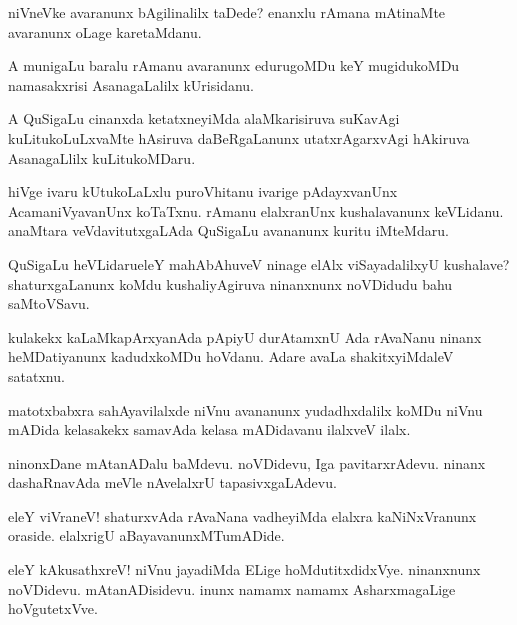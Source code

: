 \begin{mng}
niVneVke avaranunx bAgilinalilx taDede? enanxlu rAmana mAtinaMte avaranunx oLage karetaMdanu.
\end{mng}

\begin{mng}
A munigaLu baralu rAmanu avaranunx edurugoMDu keY mugidukoMDu namasakxrisi AsanagaLalilx kUrisidanu.
\end{mng}

\begin{mng}
A QuSigaLu cinanxda ketatxneyiMda alaMkarisiruva suKavAgi kuLitukoLuLxvaMte hAsiruva daBeRgaLanunx utatxrAgarxvAgi hAkiruva AsanagaLlilx kuLitukoMDaru.
\end{mng}

\begin{mng}
hiVge ivaru kUtukoLaLxlu puroVhitanu ivarige pAdayxvanUnx AcamaniVyavanUnx koTaTxnu. rAmanu elalxranUnx kushalavanunx keVLidanu. anaMtara veVdavitutxgaLAda QuSigaLu avananunx kuritu iMteMdaru.
\end{mng}

\begin{mng}
QuSigaLu heVLidaru\mdash eleY mahAbAhuveV ninage elAlx viSayadalilxyU kushalave? shaturxgaLanunx koMdu kushaliyAgiruva ninanxnunx noVDidudu bahu saMtoVSavu.
\end{mng}

\begin{mng}
kulakekx kaLaMkapArxyanAda pApiyU durAtamxnU Ada rAvaNanu ninanx heMDatiyanunx kadudxkoMDu hoVdanu. Adare avaLa shakitxyiMdaleV satatxnu.
\end{mng}

\begin{mng}
matotxbabxra sahAyavilalxde niVnu avananunx yudadhxdalilx koMDu niVnu mADida kelasakekx samavAda kelasa mADidavanu ilalxveV ilalx.
\end{mng}

\begin{mng}
ninonxDane mAtanADalu baMdevu. noVDidevu, Iga pavitarxrAdevu. ninanx dashaRnavAda meVle nAvelalxrU tapasivxgaLAdevu.
\end{mng}

\begin{mng}
eleY viVraneV! shaturxvAda rAvaNana vadheyiMda elalxra kaNiNxVranunx oraside. elalxrigU aBayavanunxMTumADide.
\end{mng}

\begin{mng}
eleY kAkusathxreV! niVnu jayadiMda ELige hoMdutitxdidxVye. ninanxnunx noVDidevu. mAtanADisidevu. inunx namamx namamx AsharxmagaLige hoVgutetxVve.
\end{mng}

